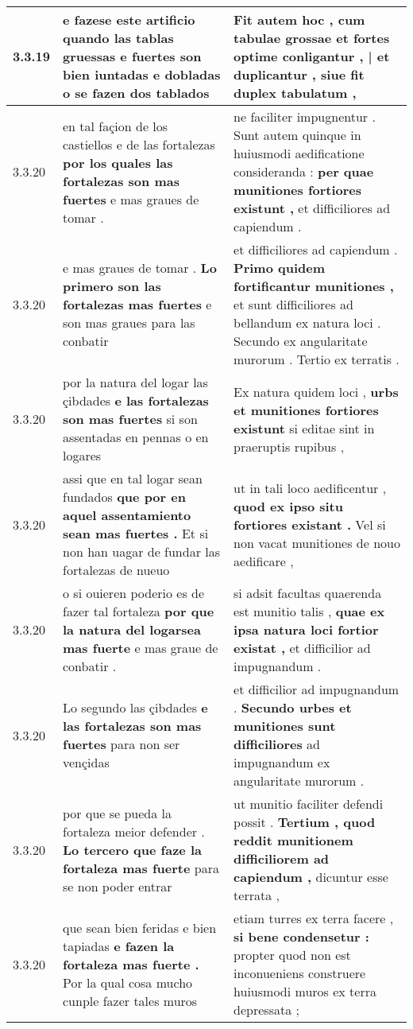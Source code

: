 \begin{tabular}{|p{1cm}|p{6.5cm}|p{6.5cm}|}
3.3.19 & e fazese este artificio \textbf{ quando las tablas gruessas e fuertes son bien iuntadas e dobladas } o se fazen dos tablados & Fit autem hoc , \textbf{ cum tabulae grossae et fortes optime conligantur , | et duplicantur , } siue fit duplex tabulatum , \\\hline
3.3.20 & en tal façion de los castiellos e de las fortalezas \textbf{ por los quales las fortalezas son mas fuertes } e mas graues de tomar . & ne faciliter impugnentur . Sunt autem quinque in huiusmodi aedificatione consideranda : \textbf{ per quae munitiones fortiores existunt , } et difficiliores ad capiendum . \\\hline
3.3.20 & e mas graues de tomar . \textbf{ Lo primero son las fortalezas mas fuertes } e son mas graues para las conbatir & et difficiliores ad capiendum . \textbf{ Primo quidem fortificantur munitiones , } et sunt difficiliores ad bellandum ex natura loci . Secundo ex angularitate murorum . Tertio ex terratis . \\\hline
3.3.20 & por la natura del logar las çibdades \textbf{ e las fortalezas son mas fuertes } si son assentadas en pennas o en logares & Ex natura quidem loci , \textbf{ urbs et munitiones fortiores existunt } si editae sint in praeruptis rupibus , \\\hline
3.3.20 & assi que en tal logar sean fundados \textbf{ que por en aquel assentamiento sean mas fuertes . } Et si non han uagar de fundar las fortalezas de nueuo & ut in tali loco aedificentur , \textbf{ quod ex ipso situ fortiores existant . } Vel si non vacat munitiones de nouo aedificare , \\\hline
3.3.20 & o si ouieren poderio es de fazer tal fortaleza \textbf{ por que la natura del logarsea mas fuerte } e mas graue de conbatir . & si adsit facultas quaerenda est munitio talis , \textbf{ quae ex ipsa natura loci fortior existat , } et difficilior ad impugnandum . \\\hline
3.3.20 & Lo segundo las çibdades \textbf{ e las fortalezas son mas fuertes } para non ser vençidas & et difficilior ad impugnandum . \textbf{ Secundo urbes et munitiones sunt difficiliores } ad impugnandum ex angularitate murorum . \\\hline
3.3.20 & por que se pueda la fortaleza meior defender . \textbf{ Lo tercero que faze la fortaleza mas fuerte } para se non poder entrar & ut munitio faciliter defendi possit . \textbf{ Tertium , quod reddit munitionem difficiliorem ad capiendum , } dicuntur esse terrata , \\\hline
3.3.20 & que sean bien feridas e bien tapiadas \textbf{ e fazen la fortaleza mas fuerte . } Por la qual cosa mucho cunple fazer tales muros & etiam turres ex terra facere , \textbf{ si bene condensetur : } propter quod non est inconueniens construere huiusmodi muros ex terra depressata ; \\\hline

\end{tabular}
